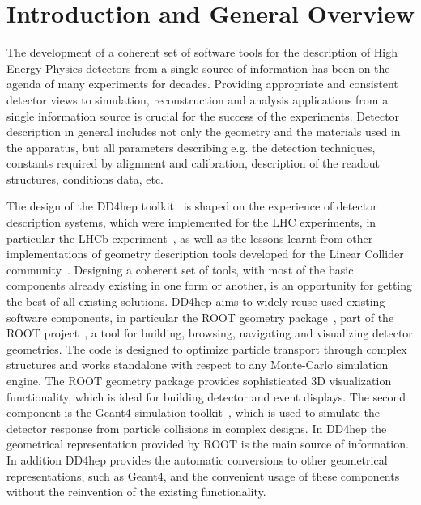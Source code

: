 \chapter{Introduction and General Overview}
\label{sec:introduction}

The development of a coherent set of software tools for the description of  High Energy Physics detectors from a single source of information has been on the agenda of many experiments for decades. Providing appropriate and consistent detector views to simulation,  reconstruction and analysis applications from a single information source is crucial for the success of the experiments. Detector description in general includes not only the geometry and the materials used in the apparatus, but all parameters describing e.g. the detection techniques, constants required by alignment and calibration, description of the readout structures, conditions data, etc. 

The design of the DD4hep toolkit~\cite{dd4hep-repo} is shaped on the experience of detector description systems, which were implemented for the LHC experiments, in particular the LHCb experiment~\cite{Antunes-Nobrega:630827,Ponce:1496875}, as well as the lessons learnt from other implementations of geometry description tools developed for the Linear Collider community~\cite{Aihara:2009ad,Abe:2010aa}. Designing a coherent set of tools, with most of the basic components already existing in one form or another, is an opportunity for getting the best of all existing solutions. DD4hep aims to widely reuse used existing software components, in particular the ROOT geometry package~\cite{Brun2003676}, part of the ROOT project~\cite{Brun:1997pa}, a tool for building, browsing, navigating and visualizing detector geometries. The code is designed to optimize particle transport through complex structures and works standalone with respect to any Monte-Carlo simulation engine. The ROOT geometry package provides sophisticated 3D visualization functionality, which is ideal for building detector and event displays. The second component is the Geant4 simulation toolkit~\cite{Agostinelli:2002hh}, which is used to simulate the detector response from particle collisions in complex designs. In DD4hep the geometrical representation provided by ROOT is the main source of information. In addition DD4hep provides the automatic conversions to other geometrical representations, such as Geant4, and the convenient usage of these components without the reinvention of the existing functionality.

